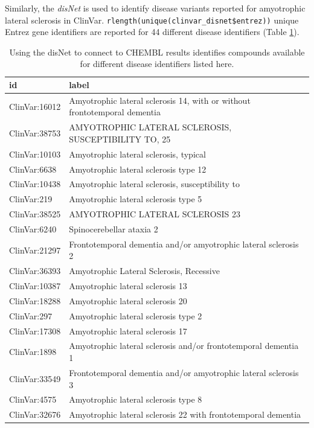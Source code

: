 \documentclass[9pt,a4paper,]{extarticle}
\begin{document}
Similarly, the \emph{disNet} is used to identify disease variants reported for amyotrophic lateral sclerosis in ClinVar. \texttt{rlength(unique(clinvar\_disnet\$entrez))} unique Entrez gene identifiers are reported for 44 different disease identifiers (Table \ref{tab:clinvarDisNetind}).

\begin{table}

\caption{\label{tab:clinvarDisNetind}Using the disNet to connect to CHEMBL results identifies compounds available for different disease identifiers listed here.}
\centering
\begin{tabular}[t]{l|l}
\hline
id & label\\
\hline
ClinVar:16012 & Amyotrophic lateral sclerosis 14, with or without frontotemporal dementia\\
\hline
ClinVar:38753 & AMYOTROPHIC LATERAL SCLEROSIS, SUSCEPTIBILITY TO, 25\\
\hline
ClinVar:10103 & Amyotrophic lateral sclerosis, typical\\
\hline
ClinVar:6638 & Amyotrophic lateral sclerosis type 12\\
\hline
ClinVar:10438 & Amyotrophic lateral sclerosis, susceptibility to\\
\hline
ClinVar:219 & Amyotrophic lateral sclerosis type 5\\
\hline
ClinVar:38525 & AMYOTROPHIC LATERAL SCLEROSIS 23\\
\hline
ClinVar:6240 & Spinocerebellar ataxia 2\\
\hline
ClinVar:21297 & Frontotemporal dementia and/or amyotrophic lateral sclerosis 2\\
\hline
ClinVar:36393 & Amyotrophic Lateral Sclerosis, Recessive\\
\hline
ClinVar:10387 & Amyotrophic lateral sclerosis 13\\
\hline
ClinVar:18288 & Amyotrophic lateral sclerosis 20\\
\hline
ClinVar:297 & Amyotrophic lateral sclerosis type 2\\
\hline
ClinVar:17308 & Amyotrophic lateral sclerosis 17\\
\hline
ClinVar:1898 & Amyotrophic lateral sclerosis and/or frontotemporal dementia 1\\
\hline
ClinVar:33549 & Frontotemporal dementia and/or amyotrophic lateral sclerosis 3\\
\hline
ClinVar:4575 & Amyotrophic lateral sclerosis type 8\\
\hline
ClinVar:32676 & Amyotrophic lateral sclerosis 22 with frontotemporal dementia\\

\end{tabular}
\end{table}
\end{document}
